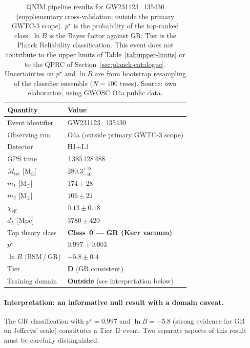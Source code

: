 \documentclass[11pt,a4paper, english]{book}
\theoremstyle{plain}
\theoremstyle{definition}
\numberwithin{equation}{chapter}
\numberwithin{figure}{chapter}
\numberwithin{table}{chapter}
\begin{document}
\begin{table}[ht]
\centering
\begin{tabular}{@{}ll@{}}
\toprule
\textbf{Quantity} & \textbf{Value} \\
\midrule
Event identifier             & GW231123\_135430 \\
Observing run                & O4a (outside primary GWTC-3 scope) \\
Detector                     & H1+L1 \\
GPS time                     & 1\,385\,128\,488 \\
$M_\mathrm{tot}$ [M$_\odot$] & $280.3^{+18}_{-16}$ \\
$m_1$ [M$_\odot$]            & $174 \pm 28$ \\
$m_2$ [M$_\odot$]            & $106 \pm 21$ \\
$\chi_\mathrm{eff}$          & $0.13 \pm 0.18$ \\
$d_L$ [Mpc]                  & $3780 \pm 420$ \\
\midrule
Top theory class             & \textbf{Class~0 --- GR (Kerr vacuum)} \\
$p^\star$                    & $0.997 \pm 0.003$ \\
$\ln B$ (BSM\,/\,GR)         & $-5.8 \pm 0.4$ \\
Tier                         & \textbf{D} (GR consistent) \\
Training domain              & \textbf{Outside} (see interpretation below) \\
\bottomrule
\end{tabular}
\caption[QNIM pipeline results for GW231123\_135430]{QNIM pipeline results for GW231123\_135430 (supplementary
         cross-validation; outside the primary GWTC-3 scope).
         $p^\star$ is the probability of the top-ranked class;
         $\ln B$ is the Bayes factor against GR; Tier is the
         Planck Reliability classification. This event does not
         contribute to the upper limits of Table~\ref{tab:upper-limits}
         or to the QPRC of Section~\ref{sec:planck-catalogue}.
         Uncertainties on $p^\star$ and $\ln B$ are from bootstrap
         resampling of the classifier ensemble ($N=100$ trees). Source: own elaboration, using GWOSC O4a public data.}
\label{tab:gw231123-results}


\end{table}

\paragraph{Interpretation: an informative null result with a domain caveat.}
The GR classification with $p^\star = 0.997$ and $\ln B = -5.8$
(strong evidence for GR on Jeffreys' scale) constitutes a Tier~D event.
Two separate aspects of this result must be carefully distinguished.
\end{document}
